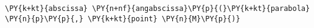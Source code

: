 \begin{Verbatim}[commandchars=\\\{\}]
      \PY{k+kt}{abscissa} \PY{n+nf}{angabscissa}\PY{p}{(}\PY{k+kt}{parabola} \PY{n}{p}\PY{p}{,} \PY{k+kt}{point} \PY{n}{M}\PY{p}{)}
\end{Verbatim}
